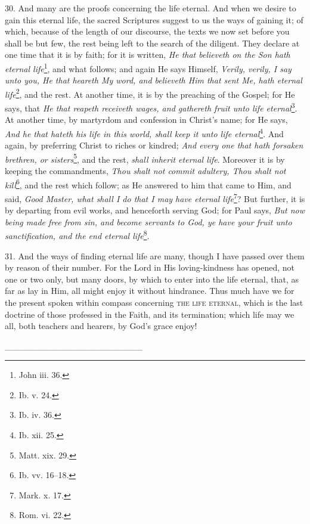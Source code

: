 30. And many are the proofs concerning the life eternal. And when we desire to gain this eternal life, the sacred Scriptures suggest to us the ways of gaining it; of which, because of the length of our discourse, the texts we now set before you shall be but few, the rest being left to the search of the diligent. They declare at one time that it is by faith; for it is written, \emph{He that believeth on the Son hath eternal life}\footnote{John iii. 36.}, and what follows; and again He says Himself, \emph{Verily, verily, I say unto you, He that heareth My word, and believeth Him that sent Me, hath eternal life}\footnote{Ib. v. 24.}, and the rest. At another time, it is by the preaching of the Gospel; for He says, that \emph{He that reapeth receiveth wages, and gathereth fruit unto life eternal}\footnote{Ib. iv. 36.}. At another time, by martyrdom and confession in Christ’s name; for He says, \emph{And he that hateth his life in this world, shall keep it unto life eternal}\footnote{Ib. xii. 25.}. And again, by preferring Christ to riches or kindred; \emph{And every one that hath forsaken brethren, or sisters}\footnote{Matt. xix. 29.}, and the rest, \emph{shall inherit eternal life}. Moreover it is by keeping the commandments, \emph{Thou shalt not commit adultery, Thou shalt not kill}\footnote{Ib. vv. 16–18.}, and the rest which follow; as He answered to him that came to Him, and said, \emph{Good Master, what shall I do that I may have eternal life}\footnote{Mark. x. 17.}? But further, it is by departing from evil works, and henceforth serving God; for Paul says, \emph{But now being made free from sin, and become servants to God, ye have your fruit unto sanctification, and the end eternal life}\footnote{Rom. vi. 22.}.

31. And the ways of finding eternal life are many, though I have passed over them by reason of their number. For the Lord in His loving-kindness has opened, not one or two only, but many doors, by which to enter into the life eternal, that, as far as lay in Him, all might enjoy it without hindrance. Thus much have we for the present spoken within compass concerning \textsc{the life eternal}, which is the last doctrine of those professed in the Faith, and its termination; which life may we all, both teachers and hearers, by God’s grace enjoy!

\_\_\_\_\_\_\_\_\_\_\_\_\_\_\_\_\_\_\_\_\_\_

